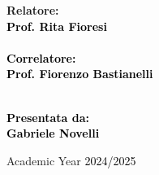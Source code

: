\documentclass[12pt,a4paper]{report}
\theoremstyle{definition}
\theoremstyle{Theorem}
\theoremstyle{definition}
\theoremstyle{definition}
\begin{document}
\begin{frontespizio}
\begin{titlepage}
			\begin{minipage}[t]{0.47\textwidth}
				{\large{\bf Relatore: \vspace{2mm}\\\textcolor{black}{
							Prof. Rita Fioresi}\\\\
						\textcolor{black}{
							\bf Correlatore: 
							\vspace{2mm}\\
							Prof. Fiorenzo Bastianelli\\\\}}
				}
			\end{minipage}
			\hfill
			\begin{minipage}[t]{0.47\textwidth}\raggedleft \textcolor{black}{
					{\large{\bf Presentata da:
							\vspace{2mm}\\
							Gabriele Novelli}}}
			\end{minipage}
			
			\vspace{40mm}
			
			\begin{center}
				Academic Year \textcolor{black}{ 2024/2025}
			\end{center}
			
		\end{titlepage}
	\end{frontespizio}
	\thispagestyle{empty}
	\mbox{}
	\newpage
\end{document}
